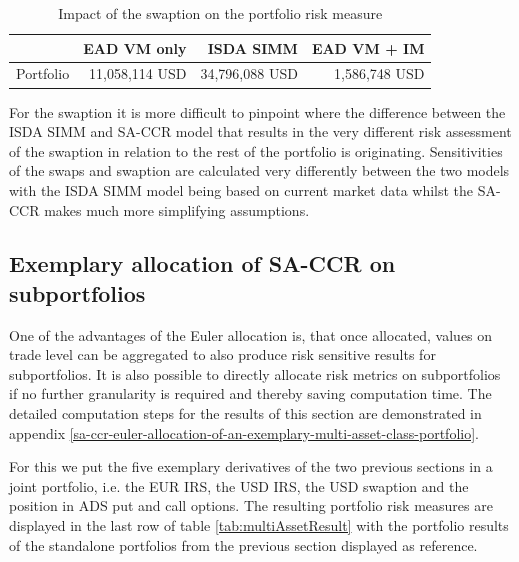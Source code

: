 \documentclass[../Thesis_AHoecherl.tex]{subfiles}
\begin{document}
    \begin{table}[htbp]
        \centering
        \begin{tabular}{l||r|r|r}
                & \gls{EAD} \gls{VM} only &\gls{ISDA SIMM} & \gls{EAD} \gls{VM} + \gls{IM} \\
                \toprule
        Portfolio & 11,058,114 USD & 34,796,088 USD & 1,586,748 USD \\
        \end{tabular}%
        \caption{Impact of the swaption on the portfolio risk measure}
        \label{tab:3TradeRatesResults}%
    \end{table}%

    For the swaption it is more difficult to pinpoint where the difference between the \gls{ISDA SIMM} and \gls{SA-CCR} model that results in the very different risk assessment of the swaption in relation to the rest of the portfolio is originating.
    Sensitivities of the swaps and swaption are calculated very differently between the two models with the \gls{ISDA SIMM} model being based on current market data whilst the \gls{SA-CCR} makes much more simplifying assumptions. 

    \subsection{Exemplary allocation of SA-CCR on subportfolios\label{sec:Exemplary allocation of SA-CCR on subportfolios}}

    One of the advantages of the Euler allocation is, that once allocated, values on trade level can be aggregated to also produce risk sensitive results for subportfolios. It is also possible to directly allocate risk metrics on subportfolios if no further granularity is required and thereby saving computation time. The detailed computation steps for the results of this section are demonstrated in appendix \ref{sa-ccr-euler-allocation-of-an-exemplary-multi-asset-class-portfolio}. 

    For this we put the five exemplary derivatives of the two previous sections in a joint portfolio, i.e. the EUR \gls{IRS}, the USD \gls{IRS}, the USD swaption and the position in ADS put and call options.
    The resulting portfolio risk measures are displayed in the last row of table \ref{tab:multiAssetResult} with the portfolio results of the standalone portfolios from the previous section displayed as reference.
\end{document}
